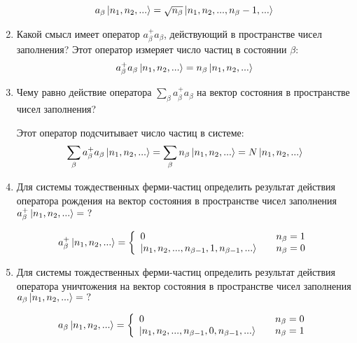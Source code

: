 \documentclass{article}
\begin{document}
\begin{enumerate}
	\begin{equation}
		a_\beta \ket{n_1, n_2, ...} = \sqrt{n_\beta} \ket{n_1, n_2, ..., n_\beta -1,...}
	\end{equation}
	
	\item {Какой смысл имеет оператор $a^+_\beta a_\beta$, действующий в пространстве чисел заполнения?}
	Этот оператор измеряет число частиц в состоянии $\beta$:
	\begin{equation}
		a^+_\beta a_\beta \ket{n_1, n_2, ...} = n_\beta \ket{n_1, n_2, ...}
	\end{equation}
	
	\item {Чему равно действие оператора $\sum\limits_{\beta}a^+_\beta a_\beta$ на вектор состояния в пространстве чисел заполнения?}
	
	Этот оператор подсчитывает число частиц в системе:
	\begin{equation}
		\sum\limits_{\beta}a^+_\beta a_\beta \ket{n_1, n_2, ...} =\sum\limits_{\beta} n_\beta \ket{n_1, n_2, ...} = N\ket{n_1, n_2, ...}
	\end{equation}
	\item {Для системы тождественных ферми-частиц определить результат действия оператора рождения на вектор состояния в пространстве чисел заполнения $a^+_\beta \ket{n_1, n_2, ...} = \ ?$}
	
	\begin{equation}
		a^+_\beta \ket{n_1, n_2, ...} = \left\{ 
  \begin{array}{l l}
    0 & \quad n_\beta = 1\\
    \ket{n_1, n_2, ..., n_{\beta -1}, 1 , n_{\beta -1},...} & \quad n_\beta = 0
  \end{array} \right.
	\end{equation}
	
	\item {Для системы тождественных ферми-частиц определить результат действия оператора уничтожения на вектор состояния в пространстве чисел заполнения $a_\beta \ket{n_1, n_2, ...} = \ ?$}
	
	\begin{equation}
		a_\beta \ket{n_1, n_2, ...} = \left\{ 
  \begin{array}{l l}
    0 & \quad n_\beta = 0\\
    \ket{n_1, n_2, ..., n_{\beta -1}, 0 , n_{\beta -1},...} & \quad n_\beta = 1
  \end{array} \right.
	\end{equation}
	

\end{enumerate}
\end{document}
